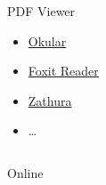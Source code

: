 \begin{frame}
\begin{columns}
\begin{column}{0.33\textwidth}
\begin{block}{PDF Viewer}
{\begin{itemize}
                        \item \href{https://okular.kde.org/}{Okular}
                        \item \href{https://www.foxitsoftware.com/products/pdf-reader/}{Foxit Reader}
                        \item \href{https://pwmt.org/projects/zathura/}{Zathura}
                        \item \ldots
                    \end{itemize}
                }
            \end{block}
        \end{column}
    \end{columns}
    \pause
    \begin{block}{Online}
    \end{block}
\end{frame}
